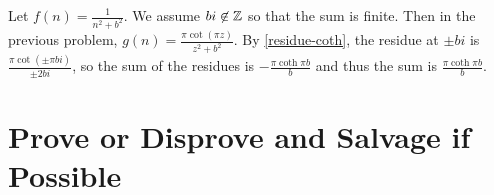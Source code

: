 \documentclass{homework}
\begin{document}
                                                                                                                                                                                                        \begin{solution}
                                                                                                                                                                                                        Let $f(n) = \frac{1}{n^2+b^2}$. We assume $bi \not \in \mathbb{Z}$ so that the sum is finite. Then in the previous problem, $g(n) = \frac{\pi\cot(\pi z)}{z^2 + b^2}$. By \ref{residue-coth}, the residue at $\pm bi$ is $\frac{\pi\cot(\pm \pi bi)}{\pm 2bi}$, so the sum of the residues is $-\frac{\pi \coth{\pi b}}{b}$ and thus the sum is $\frac{\pi \coth{\pi b}}{b}$.
                                                                                                                                                                                                        \end{solution}
                                                                                                                                                                                                        \section{Prove or Disprove and Salvage if Possible}
\end{document}

